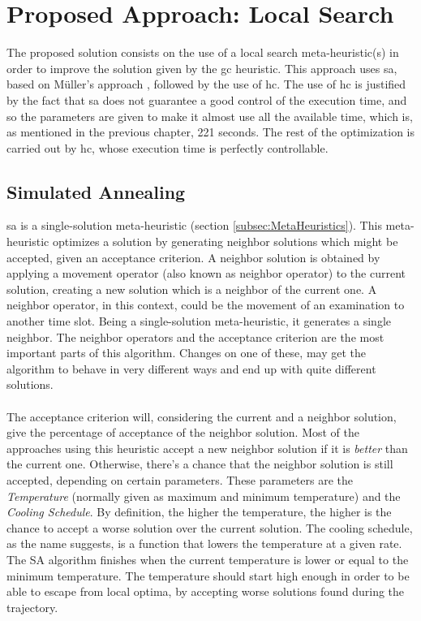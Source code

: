 \chapter{Proposed Approach: Local Search}
\label{chap:LocalSearch}
\thispagestyle{plain}

The proposed solution consists on the use of a local search meta-heuristic(s) in order to improve the solution given by the \gls{gc} heuristic. This approach uses \gls{sa}, based on M\"{u}ller's approach \cite{Mueller2009}, followed by the use of \gls{hc}. The use of \gls{hc} is justified by the fact that \gls{sa} does not guarantee a good control of the execution time, and so the parameters are given to make it almost use all the available time, which is, as mentioned in the previous chapter, 221 seconds. The rest of the optimization is carried out by \gls{hc}, whose execution time is perfectly controllable.

\section{Simulated Annealing}
\label{sec:SimulatedAnnealing}

\gls{sa} is a single-solution meta-heuristic (section \ref{subsec:MetaHeuristics}). This meta-heuristic optimizes a solution by generating neighbor solutions which might be accepted, given an acceptance criterion. A neighbor solution is obtained by applying a movement operator (also known as neighbor operator) to the current solution, creating a new solution which is a neighbor of the current one. A neighbor operator, in this context, could be the movement of an examination to another time slot. Being a single-solution meta-heuristic, it generates a single neighbor. The neighbor operators and the acceptance criterion are the most important parts of this algorithm. Changes on one of these, may get the algorithm to behave in very different ways and end up with quite different solutions.\\
\\
The acceptance criterion will, considering the current and a neighbor solution, give the percentage of acceptance of the neighbor solution. Most of the approaches using this heuristic accept a new neighbor solution if it is \textit{better} than the current one. Otherwise, there's a chance that the neighbor solution is still accepted, depending on certain parameters. These parameters are the \textit{Temperature} (normally given as maximum and minimum temperature) and the \textit{Cooling Schedule}. By definition, the higher the temperature, the higher is the chance to accept a worse solution over the current solution. The cooling schedule, as the name suggests, is a function that lowers the temperature at a given rate. The SA algorithm finishes when the current temperature is lower or equal to the minimum temperature. The temperature should start high enough in order to be able to escape from local optima, by accepting worse solutions found during the trajectory.

